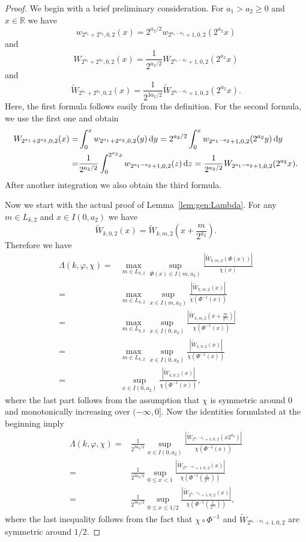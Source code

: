 \documentclass[namedate,webpdf,imanum]{ima-authoring-arxiv}%
\theoremstyle{thmstyletwo}%
\numberwithin{equation}{section}
\newcommand{\rd}{\, {\rm d}}
\newcommand{\RR}{\mathbb{R}}
\begin{document}
\begin{proof}
We begin with a brief preliminary consideration. For $a_1 > a_2 \ge 0$ and $x \in \RR$ we have 
\begin{equation}\label{eq_w_factor}
w_{2^{a_1}+2^{a_2},0,2}(x)=2^{a_2/2} w_{2^{a_1-a_2}+1,0,2}(2^{a_2}x)
\end{equation}
and $$W_{2^{a_1}+2^{a_2},0,2}(x)=\frac{1}{2^{a_2/2}} W_{2^{a_1-a_2}+1,0,2}(2^{a_2}x)$$
and $$\widetilde{W}_{2^{a_1}+2^{a_2},0,2}(x)=\frac{1}{2^{3a_2/2}} \widetilde{W}_{2^{a_1-a_2}+1,0,2}(2^{a_2}x).$$ 
Here, the first formula follows easily from the definition. For the second formula, we use the first one and obtain
\begin{align*}
W_{2^{a_1}+2^{a_2},0,2}(x) = & \int_0^x w_{2^{a_1}+2^{a_2},0,2}(y) \rd y =  2^{a_2/2} \int_0^x w_{2^{a_1-a_2}+1,0,2}(2^{a_2}y)  \rd y  \\
= & \frac{1}{2^{a_2/2}} \int_0^{2^{a_2} x} w_{2^{a_1-a_2}+1,0,2}(z)  \rd z
=  \frac{1}{2^{a_2/2}} W_{2^{a_1-a_2}+1,0,2}(2^{a_2}x).
\end{align*}
After another integration we also obtain the third formula.

Now we start with the actual proof of Lemma~\ref{lem:gen:Lambda}. For any $m \in L_{k,2}$  and $x \in I(0,a_2)$ we have
\begin{equation*}
\widetilde{W}_{k,0,2}(x) = \widetilde{W}_{k,m,2}\left( x + \frac{m}{2^{a_2}} \right).
\end{equation*}
Therefore we have
\begin{align*}
\Lambda(k,\varphi, \chi) = &  \max_{m \in L_{k,2}} \sup_{\Phi(x) \in I(m,a_2)} \frac{|\widetilde{W}_{k,m,2}(\Phi(x))|}{\chi(x)} \\ 
= & \max_{m \in L_{k,2}} \sup_{x \in I(m,a_2)} \frac{|\widetilde{W}_{k,m,2}(x)|}{\chi(\Phi^{-1}(x))} \\ 
= & \max_{m \in L_{k,2}} \sup_{x \in I(0,a_2)}  \frac{|\widetilde{W}_{k,m,2}( x + \frac{m}{2^{a_2}})|}{\chi(\Phi^{-1}(x))} \\
= & \max_{m \in L_{k,2}} \sup_{x \in I(0,a_2)}  \frac{|\widetilde{W}_{k,0,2}(x)|}{\chi(\Phi^{-1}(x))} \\
= & \sup_{x \in I(0,a_2)} \frac{|\widetilde{W}_{k,0,2}(x)|}{\chi(\Phi^{-1}(x))},
\end{align*}
where the last part follows from the assumption that $\chi$ is symmetric around $0$ and monotonically increasing over $(-\infty,0]$. Now the identities formulated at the beginning imply 
\begin{align*}
\Lambda(k,\varphi, \chi) = & \frac{1}{2^{3 a_2/2}} \sup_{x \in I(0,a_2)} \frac{|\widetilde{W}_{2^{a_1-a_2} + 1,0,2}(x2^{a_2})|}{\chi(\Phi^{-1}(x))} \\ = &  \frac{1}{2^{3 a_2/2}} \sup_{0 \le x < 1} \frac{|\widetilde{W}_{2^{a_1-a_2} + 1,0,2}(x)|}{\chi(\Phi^{-1}(\frac{x}{2^{a_2}}))} \\ = & \frac{1}{2^{3 a_2/2}} \sup_{0 \le x \le 1/2} \frac{|\widetilde{W}_{2^{a_1-a_2} + 1,0,2}(x)|}{\chi(\Phi^{-1}(\frac{x}{2^{a_2}}))},
\end{align*}
where the last inequality follows from the fact that $\chi \circ \Phi^{-1}$ and $\widetilde{W}_{2^{a_1-a_2}+1,0,2}$ are symmetric around $1/2$.


\end{proof}
\end{document}
